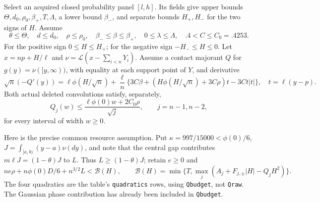 Select an acquired closed probability panel $[l,h]$.
Its fields give upper bounds $\Theta,d_0,\rho_0,\beta_+,T,\Lambda$,
a lower bound $\beta_-$, and separate bounds $H_+,H_-$ for the two signs of
$H$. Assume
\[
 \theta\le\Theta,\quad d\le d_0,\quad \rho\le\rho_0,
 \quad \beta_-\le\beta\le\beta_+,\quad 0\le\lambda\le\Lambda,
 \quad .4<C\le C_0=.4253.
\]
For the positive sign $0\le H\le H_+$; for the negative sign
$-H_-\le H\le0$. Let $x=np+H/\ell$ and
$\nu=\mathcal L(x-\sum_{i<n}Y_i)$. Assume a contact majorant $Q$ for
$g(y)=\nu([y,\infty))$, with equality at each support point of $Y$,
and derivative
\begin{equation}\label{j:local:conf:derivative}
 \sqrt n(-Q'(y))=\ell\phi(H/\sqrt n)
 +\frac\ell n\{3C\beta+(H\phi(H/\sqrt n)+3C\rho)t-3Ct|t|\},
 \quad t=\ell(y-p).
\end{equation}
Both actual deleted convolutions satisfy, separately,
\begin{equation}\label{j:local:conf:concentration}
 Q_j(w)\le\frac{\ell\phi(0)w+2C_0\rho}{\sqrt j},
 \qquad j=n-1,n-2,
\end{equation}
for every interval of width $w\ge0$.

Here is the precise common resource assumption. Put
$\kappa=997/15000<\phi(0)/6$, $J=\int_{[a,b)}(y-a)\nu(dy)$,
and note that the central gap contributes $m\ell J=(1-\theta)J$ to $L$.
Thus $L\ge(1-\theta)J$; retain $e\ge0$ and
\begin{equation}\label{j:local:conf:budget}
 n e\rho+n\phi(0)D/6+n^{3/2}L<\mathcal B(H),\qquad
 \mathcal B(H)=\min\{T,\max_j(A_j+F_{j,\pm}|H|-Q_jH^2)\}.
\end{equation}
The four quadratics are the table's \texttt{quadratics} rows, using
\texttt{Qbudget}, not \texttt{Qraw}. The Gaussian phase contribution
has already been included in \texttt{Qbudget}.


